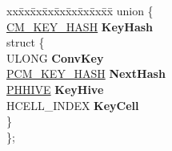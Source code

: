 \begin{DoxyCompactItemize}
\begin{tabbing}
\end{tabbing}\item 
\mbox{\label{struct___c_m___k_e_y___c_o_n_t_r_o_l___b_l_o_c_k_af7fe79aad03c142beef4723a57a7fdb4}} 
\begin{tabbing}
xx\=xx\=xx\=xx\=xx\=xx\=xx\=xx\=xx\=\kill
union \{\\
\>\hyperlink{struct___c_m___k_e_y___h_a_s_h}{CM\_KEY\_HASH} {\bfseries KeyHash}\\
\mbox{\label{union___c_m___k_e_y___c_o_n_t_r_o_l___b_l_o_c_k_1_1_0D1405_ab44ffaff6cf4d4b33498346c7dc3292e}} 
\>struct \{\\
\>\>ULONG {\bfseries ConvKey}\\
\>\>\hyperlink{struct___c_m___k_e_y___h_a_s_h}{PCM\_KEY\_HASH} {\bfseries NextHash}\\
\>\>\hyperlink{struct___h_h_i_v_e}{PHHIVE} {\bfseries KeyHive}\\
\>\>HCELL\_INDEX {\bfseries KeyCell}\\
\>\} \\
\}; \\


\end{tabbing}
\end{DoxyCompactItemize}
